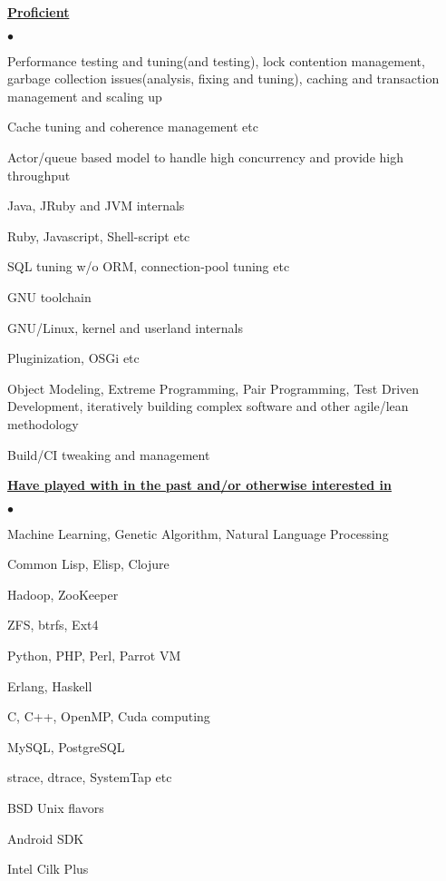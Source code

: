 \documentclass[margin,line]{res}
\newenvironment{list2}{
  \begin{list}{$\bullet$}{%
      \setlength{\itemsep}{0in}
      \setlength{\parsep}{0in} \setlength{\parskip}{0in}
      \setlength{\topsep}{0in} \setlength{\partopsep}{0in} 
      \setlength{\leftmargin}{0.2in}}}{\end{list}}
\begin{document}
\begin{resume}
{\underline {\bf Proficient}} \hfill\\
\vspace{-.3cm}
\begin{list2}
\item Performance testing and tuning(and testing), lock contention management, garbage collection issues(analysis, fixing and tuning), caching and transaction management and scaling up
\item Cache tuning and coherence management etc
\item Actor/queue based model to handle high concurrency and provide high throughput
\item Java, JRuby and JVM internals
\item Ruby, Javascript, Shell-script etc
\item SQL tuning w/o ORM, connection-pool tuning etc
\item GNU toolchain
\item GNU/Linux, kernel and userland internals
\item Pluginization, OSGi etc
\item Object Modeling, Extreme Programming, Pair Programming, Test Driven Development, iteratively building complex software and other agile/lean methodology
\item Build/CI tweaking and management
\end{list2}

{\underline {\bf Have played with in the past and/or otherwise interested in}} \hfill\\
\vspace{-.3cm}
\begin{list2}
\item Machine Learning, Genetic Algorithm, Natural Language Processing
\item Common Lisp, Elisp, Clojure
\item Hadoop, ZooKeeper
\item ZFS, btrfs, Ext4
\item Python, PHP, Perl, Parrot VM
\item Erlang, Haskell
\item C, C++, OpenMP, Cuda computing
\item MySQL, PostgreSQL
\item strace, dtrace, SystemTap etc
\item BSD Unix flavors
\item Android SDK
\item Intel Cilk Plus
\end{list2}


\end{resume}
\end{document}
